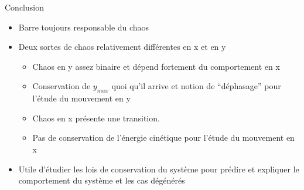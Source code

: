 \documentclass{beamer}
\begin{document}
  \begin{frame}{Conclusion}
  \begin{itemize}
    \item Barre toujours responsable du chaos
    \item Deux sortes de chaos relativement différentes en x et en y
    \begin{itemize}
      \item Chaos en y assez binaire et dépend fortement du comportement en x
      \item Conservation de \(y_{max}\) quoi qu'il arrive et notion de ``déphasage'' pour l'étude du mouvement en y
      \pause \item Chaos en x présente une transition.
      \item Pas de conservation de l'énergie cinétique pour l'étude du mouvement en x
    \end{itemize}
    \item Utile d'étudier les lois de conservation du système pour prédire et expliquer le comportement du système et les cas dégénérés
  \end{itemize}
  \begin{center}
  \end{center}
  \end{frame}
  
\end{document}
